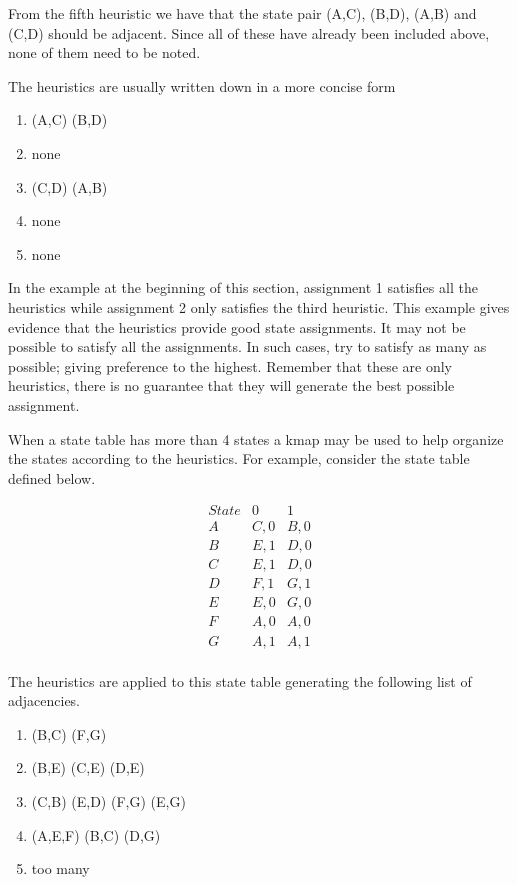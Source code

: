 From the fifth heuristic we have that the state pair (A,C),
(B,D), (A,B) and (C,D) should be adjacent.  Since all of these
have already been included above, none of them need to be noted.

The heuristics are usually written down in a more concise form
\begin{enumerate}
    \item (A,C) (B,D)
    \item none
    \item (C,D) (A,B)
    \item none
    \item none
\end{enumerate}

In the example at the beginning of this section, assignment 1 satisfies
all the heuristics while assignment 2 only satisfies the third heuristic.
This example gives evidence that the heuristics provide good
state assignments.  It may not be possible to satisfy all the
assignments.  In such cases, try to satisfy as many as possible;
giving preference to the highest.  Remember that these are only
heuristics, there is no guarantee that they will generate the best
possible assignment.

When a state table has more than 4 states a kmap may be used to help
organize the states according to the heuristics.  For example,
consider the state table defined below.

$$
\begin{array} {c||c|c}
    State   & 0   & 1   \\ \hline
    A       & C,0  & B,0 \\ \hline
    B       & E,1  & D,0 \\ \hline
    C       & E,1  & D,0 \\ \hline
    D       & F,1  & G,1 \\ \hline
    E       & E,0  & G,0 \\ \hline
    F       & A,0  & A,0 \\ \hline
    G       & A,1  & A,1 \\
\end{array} $$

The heuristics are applied to this state table generating the following
list of adjacencies.

\begin{enumerate}
    \item (B,C) (F,G)
    \item (B,E) (C,E) (D,E)
    \item (C,B) (E,D) (F,G) (E,G)
    \item (A,E,F) (B,C) (D,G)
    \item too many
\end{enumerate}


